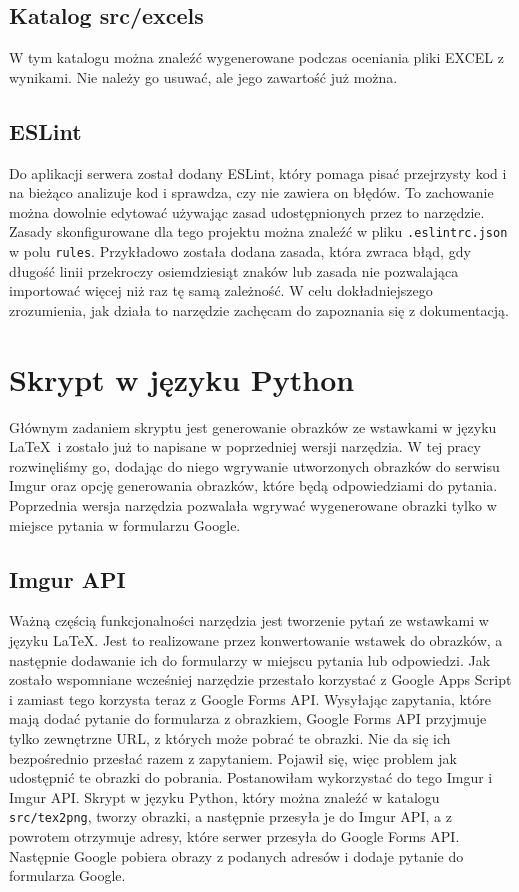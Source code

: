\subsection{Katalog src/excels}
W tym katalogu można znaleźć wygenerowane podczas oceniania pliki EXCEL z wynikami. Nie należy go
usuwać, ale jego zawartość już można.

\subsection{ESLint}
Do aplikacji serwera został dodany ESLint\cite{eslint}, który pomaga pisać przejrzysty kod i na bieżąco
analizuje kod i sprawdza, czy nie zawiera on błędów. To zachowanie można dowolnie edytować używając 
zasad udostępnionych przez to narzędzie. Zasady skonfigurowane dla tego projektu można znaleźć 
w pliku \texttt{.eslintrc.json} w polu \texttt{rules}. Przykładowo została dodana zasada,
która zwraca błąd, gdy długość linii przekroczy osiemdziesiąt znaków lub zasada nie
pozwalająca importować więcej niż raz tę samą zależność. W celu dokładniejszego zrozumienia, jak działa to narzędzie 
zachęcam do zapoznania się z dokumentacją.

\section{Skrypt w języku Python}

Głównym zadaniem skryptu jest generowanie obrazków ze wstawkami w języku \LaTeX \ i zostało
już to napisane w poprzedniej wersji narzędzia. W tej pracy rozwinęliśmy go, dodając do
niego wgrywanie utworzonych obrazków do serwisu Imgur oraz opcję generowania
obrazków, które będą odpowiedziami do pytania. Poprzednia wersja narzędzia pozwalała
wgrywać wygenerowane obrazki tylko w miejsce pytania w formularzu Google.

\subsection{Imgur API}
Ważną częścią funkcjonalności narzędzia jest tworzenie pytań ze wstawkami w języku \LaTeX.
Jest to realizowane przez konwertowanie wstawek do obrazków, a następnie dodawanie ich do 
formularzy w miejscu pytania lub odpowiedzi. Jak zostało wspomniane wcześniej narzędzie
przestało korzystać z Google Apps Script i zamiast tego korzysta teraz z Google Forms API.
Wysyłając zapytania, które mają dodać pytanie do formularza z obrazkiem, Google Forms API
przyjmuje tylko zewnętrzne URL, z których może pobrać te obrazki. Nie da się ich
bezpośrednio przesłać razem z zapytaniem. Pojawił się, więc problem jak udostępnić te
obrazki do pobrania. Postanowiłam wykorzystać do tego Imgur i Imgur API. Skrypt w języku Python,
który można znaleźć w katalogu \texttt{src/tex2png}, tworzy obrazki, a następnie przesyła je 
do Imgur API, a z powrotem otrzymuje adresy, które serwer przesyła do Google Forms API.
Następnie Google pobiera obrazy z podanych adresów i dodaje pytanie do formularza Google.

